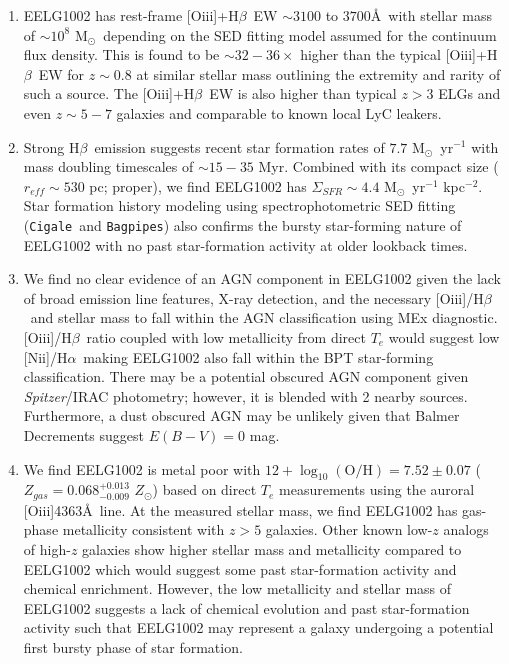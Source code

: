 \documentclass[twocolumn,tight,times,linenumbers]{aastex631}
\newcommand{\halpha}{H$\alpha$}
\newcommand{\hbeta}{H$\beta$}
\newcommand{\nii}{[N{\sc ii}]}
\newcommand{\oiii}{[O{\sc iii}]}
\newcommand{\msol}{M$_\odot$}
\newcommand{\zsol}{$Z_\odot$}
\newcommand{\cigale}{\texttt{Cigale}}
\newcommand{\bagpipes}{\texttt{Bagpipes}}
\begin{document}
		\begin{enumerate}[nolistsep,label=(\roman*)]
			\item EELG1002 has rest-frame \oiii+\hbeta~EW $\sim 3100$ to $3700$\AA~with stellar mass of $\sim 10^8$ \msol~depending on the SED fitting model assumed for the continuum flux density. This is found to be $\sim 32 - 36 \times$ higher than the typical \oiii+\hbeta~EW for $z \sim 0.8$ at similar stellar mass outlining the extremity and rarity of such a source. The \oiii+\hbeta~EW is also higher than typical $z > 3$ ELGs  \citep{Khostovan2016,Boyett2024} and even $z \sim 5 - 7$ galaxies \citep{Matthee2023} and comparable to known local LyC leakers.
			
			\item Strong \hbeta~emission suggests recent star formation rates of $7.7$ \msol~yr$^{-1}$ with mass doubling timescales of $\sim 15 - 35$ Myr. Combined with its compact size ($r_{eff} \sim 530$ pc; proper), we find EELG1002 has $\Sigma_{SFR} \sim 4.4$ \msol~yr$^{-1}$ kpc$^{-2}$. Star formation history modeling using spectrophotometric SED fitting (\cigale~and \bagpipes) also confirms the bursty star-forming nature of EELG1002 with no past star-formation activity at older lookback times.
						
			\item We find no clear evidence of an AGN component in EELG1002 given the lack of broad emission line features, X-ray detection, and the necessary \oiii/\hbeta~and stellar mass to fall within the AGN classification using MEx diagnostic. \oiii/\hbeta~ratio coupled with low metallicity from direct $T_e$ would suggest low \nii/\halpha~making EELG1002 also fall within the BPT star-forming classification. There may be a potential obscured AGN component given \textit{Spitzer}/IRAC photometry; however, it is blended with 2 nearby sources. Furthermore, a dust obscured AGN may be unlikely given that Balmer Decrements suggest $E(B-V) = 0$ mag.
			
			\item We find EELG1002 is metal poor with $12+\log_{10} (\textrm{O/H}) = 7.52\pm0.07$ ($Z_{gas} = 0.068^{+0.013}_{-0.009}$ \zsol) based on direct $T_e$ measurements using the auroral \oiii4363\AA~line. At the measured stellar mass, we find EELG1002 has gas-phase metallicity consistent with $z > 5$ galaxies. Other known low-$z$ analogs of high-$z$ galaxies show higher stellar mass and metallicity compared to EELG1002 which would suggest some past star-formation activity and chemical enrichment. However, the low metallicity and stellar mass of EELG1002 suggests a lack of chemical evolution and past star-formation activity such that EELG1002 may represent a galaxy undergoing a potential first bursty phase of star formation.
			

\end{enumerate}
\end{document}
